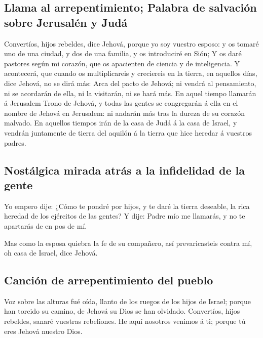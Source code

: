\hypertarget{llama-al-arrepentimiento-palabra-de-salvaciuxf3n-sobre-jerusaluxe9n-y-juduxe1}{%
\subsection{Llama al arrepentimiento; Palabra de salvación sobre
Jerusalén y
Judá}\label{llama-al-arrepentimiento-palabra-de-salvaciuxf3n-sobre-jerusaluxe9n-y-juduxe1}}

 Convertíos, hijos rebeldes, dice Jehová, porque yo soy
vuestro esposo: y os tomaré uno de una ciudad, y dos de una familia, y
os introduciré en Sión;  Y os daré pastores según mi
corazón, que os apacienten de ciencia y de inteligencia.  Y
acontecerá, que cuando os multiplicareis y creciereis en la tierra, en
aquellos días, dice Jehová, no se dirá más: Arca del pacto de Jehová; ni
vendrá al pensamiento, ni se acordarán de ella, ni la visitarán, ni se
hará más.  En aquel tiempo llamarán á Jerusalem Trono de
Jehová, y todas las gentes se congregarán á ella en el nombre de Jehová
en Jerusalem: ni andarán más tras la dureza de su corazón malvado.
 En aquellos tiempos irán de la casa de Judá á la casa de
Israel, y vendrán juntamente de tierra del aquilón á la tierra que hice
heredar á vuestros padres.

\hypertarget{nostuxe1lgica-mirada-atruxe1s-a-la-infidelidad-de-la-gente}{%
\subsection{Nostálgica mirada atrás a la infidelidad de la
gente}\label{nostuxe1lgica-mirada-atruxe1s-a-la-infidelidad-de-la-gente}}

 Yo empero dije: ¿Cómo te pondré por hijos, y te daré la
tierra deseable, la rica heredad de los ejércitos de las gentes? Y dije:
Padre mío me llamarás, y no te apartarás de en pos de mí.

 Mas como la esposa quiebra la fe de su compañero, así
prevaricasteis contra mí, oh casa de Israel, dice Jehová.

\hypertarget{canciuxf3n-de-arrepentimiento-del-pueblo}{%
\subsection{Canción de arrepentimiento del
pueblo}\label{canciuxf3n-de-arrepentimiento-del-pueblo}}

 Voz sobre las alturas fué oída, llanto de los ruegos de
los hijos de Israel; porque han torcido su camino, de Jehová su Dios se
han olvidado.  Convertíos, hijos rebeldes, sanaré vuestras
rebeliones. He aquí nosotros venimos á ti; porque tú eres Jehová nuestro
Dios.

